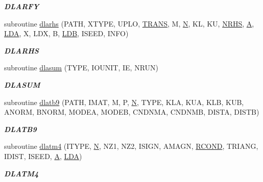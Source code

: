 \begin{DoxyCompactItemize}
\begin{DoxyCompactList}\small\item\em {\bfseries D\+L\+A\+R\+F\+Y} \end{DoxyCompactList}\item 
subroutine \hyperlink{group__double__eig_gada4fcd971471a815d7d0bba57fdf627b}{dlarhs} (P\+A\+T\+H, X\+T\+Y\+P\+E, U\+P\+L\+O, \hyperlink{superlu__enum__consts_8h_a0c4e17b2d5cea33f9991ccc6a6678d62a1f61e3015bfe0f0c2c3fda4c5a0cdf58}{T\+R\+A\+N\+S}, M, \hyperlink{polmisc_8c_a0240ac851181b84ac374872dc5434ee4}{N}, K\+L, K\+U, \hyperlink{example__user_8c_aa0138da002ce2a90360df2f521eb3198}{N\+R\+H\+S}, \hyperlink{classA}{A}, \hyperlink{example__user_8c_ae946da542ce0db94dced19b2ecefd1aa}{L\+D\+A}, X, L\+D\+X, B, \hyperlink{example__user_8c_a50e90a7104df172b5a89a06c47fcca04}{L\+D\+B}, I\+S\+E\+E\+D, I\+N\+F\+O)
\begin{DoxyCompactList}\small\item\em {\bfseries D\+L\+A\+R\+H\+S} \end{DoxyCompactList}\item 
subroutine \hyperlink{group__double__eig_ga3fd4cb18655d3b4b20912ad7f57c6890}{dlasum} (T\+Y\+P\+E, I\+O\+U\+N\+I\+T, I\+E, N\+R\+U\+N)
\begin{DoxyCompactList}\small\item\em {\bfseries D\+L\+A\+S\+U\+M} \end{DoxyCompactList}\item 
subroutine \hyperlink{group__double__eig_gab048b044b8daf142a4780aa5dd1e68ab}{dlatb9} (P\+A\+T\+H, I\+M\+A\+T, M, P, \hyperlink{polmisc_8c_a0240ac851181b84ac374872dc5434ee4}{N}, T\+Y\+P\+E, K\+L\+A, K\+U\+A, K\+L\+B, K\+U\+B, A\+N\+O\+R\+M, B\+N\+O\+R\+M, M\+O\+D\+E\+A, M\+O\+D\+E\+B, C\+N\+D\+N\+M\+A, C\+N\+D\+N\+M\+B, D\+I\+S\+T\+A, D\+I\+S\+T\+B)
\begin{DoxyCompactList}\small\item\em {\bfseries D\+L\+A\+T\+B9} \end{DoxyCompactList}\item 
subroutine \hyperlink{group__double__eig_ga0ac7051d7e9a8e10930e4b1bcd19fe3f}{dlatm4} (I\+T\+Y\+P\+E, \hyperlink{polmisc_8c_a0240ac851181b84ac374872dc5434ee4}{N}, N\+Z1, N\+Z2, I\+S\+I\+G\+N, A\+M\+A\+G\+N, \hyperlink{superlu__enum__consts_8h_af00a42ecad444bbda75cde1b64bd7e72a9b5c151728d8512307565994c89919d5}{R\+C\+O\+N\+D}, T\+R\+I\+A\+N\+G, I\+D\+I\+S\+T, I\+S\+E\+E\+D, \hyperlink{classA}{A}, \hyperlink{example__user_8c_ae946da542ce0db94dced19b2ecefd1aa}{L\+D\+A})
\begin{DoxyCompactList}\small\item\em {\bfseries D\+L\+A\+T\+M4} \end{DoxyCompactList}\item 

\end{DoxyCompactItemize}
